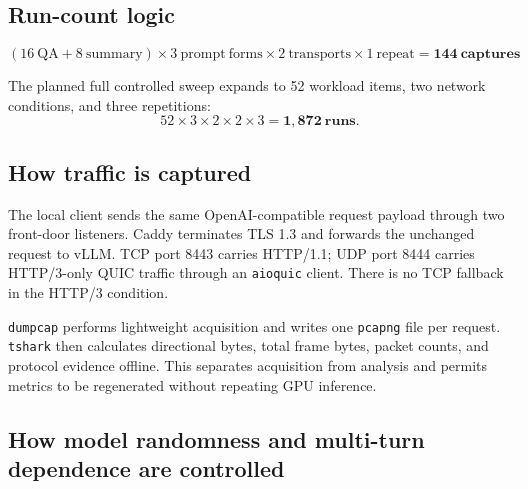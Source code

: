 \documentclass[10pt]{article}
\begin{document}
\subsection{Run-count logic}

\[
  (16\ \mathrm{QA} + 8\ \mathrm{summary})
  \times 3\ \mathrm{prompt\ forms}
  \times 2\ \mathrm{transports}
  \times 1\ \mathrm{repeat}
  = \mathbf{144\ captures}
\]

The planned full controlled sweep expands to 52 workload items, two network
conditions, and three repetitions:
\[
  52 \times 3 \times 2 \times 2 \times 3 = \mathbf{1,872\ runs}.
\]

\subsection{How traffic is captured}

The local client sends the same OpenAI-compatible request payload through two
front-door listeners. Caddy terminates TLS 1.3 and forwards the unchanged
request to vLLM. TCP port 8443 carries HTTP/1.1; UDP port 8444 carries
HTTP/3-only QUIC traffic through an \texttt{aioquic} client. There is no TCP
fallback in the HTTP/3 condition.

\begin{center}
\small
{}
\end{center}

\texttt{dumpcap} performs lightweight acquisition and writes one
\texttt{pcapng} file per request. \texttt{tshark} then calculates directional
bytes, total frame bytes, packet counts, and protocol evidence offline. This
separates acquisition from analysis and permits metrics to be regenerated
without repeating GPU inference.

\subsection{How model randomness and multi-turn dependence are controlled}
\end{document}
